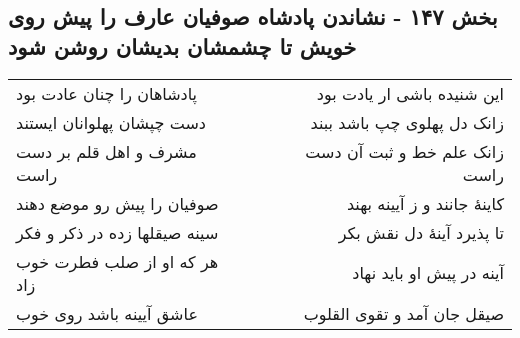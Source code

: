 \begin{center}
\section*{بخش ۱۴۷ - نشاندن پادشاه صوفیان عارف را پیش روی خویش تا چشمشان بدیشان روشن شود}
\label{sec:sh147}
\begin{longtable}{l p{0.5cm} r}
پادشاهان را چنان عادت بود
&&
این شنیده باشی ار یادت بود
\\
دست چپشان پهلوانان ایستند
&&
زانک دل پهلوی چپ باشد ببند
\\
مشرف و اهل قلم بر دست راست
&&
زانک علم خط و ثبت آن دست راست
\\
صوفیان را پیش رو موضع دهند
&&
کاینهٔ جانند و ز آیینه بهند
\\
سینه صیقلها زده در ذکر و فکر
&&
تا پذیرد آینهٔ دل نقش بکر
\\
هر که او از صلب فطرت خوب زاد
&&
آینه در پیش او باید نهاد
\\
عاشق آیینه باشد روی خوب
&&
صیقل جان آمد و تقوی القلوب
\\
\end{longtable}
\end{center}
